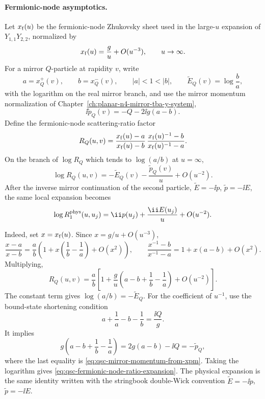 \paragraph{Fermionic-node asymptotics.}
Let \(x_{\rm f}(u)\) be the fermionic-node Zhukovsky sheet used in the
large-\(u\) expansion of \(Y_{1,1}Y_{2,2}\), normalized by
\[
  x_{\rm f}(u)=\frac{g}{u}+O(u^{-3}),\qquad u\to\infty .
\]
For a mirror \(Q\)-particle at rapidity \(v\), write
\[
  a=x_Q^+(v),\qquad b=x_Q^-(v),
  \qquad |a|<1<|b|,
  \qquad
  \widetilde E_Q(v)=\log\frac{b}{a},
\]
with the logarithm on the real mirror branch, and use the mirror momentum
normalization of Chapter~\ref{ch:planar-n4-mirror-tba-y-system},
\begin{equation}
  \ii\widetilde p_Q(v)=-Q-2\ii g(a-b).
  \label{eq:qsc-mirror-momentum-from-xpm}
\end{equation}
Define the fermionic-node scattering-ratio factor
\[
  R_Q(u,v)=
  \frac{x_{\rm f}(u)-a}{x_{\rm f}(u)-b}\,
  \frac{x_{\rm f}(u)^{-1}-b}{x_{\rm f}(u)^{-1}-a}.
\]
On the branch of \(\log R_Q\) which tends to
\(\log(a/b)\) at \(u=\infty\),
\begin{equation}
  \log R_Q(u,v)
  =
  -\widetilde E_Q(v)-\frac{\widetilde p_Q(v)}{u}
  +O(u^{-2}).
  \label{eq:qsc-fermionic-node-ratio-expansion}
\end{equation}
After the inverse mirror continuation of the second particle,
\(\widetilde E=-\ii p\), \(\widetilde p=-\ii E\), the same local expansion
becomes
\[
  \log R_1^{\rm phys}(u,u_j)
  =
  \ii p(u_j)+\frac{\ii E(u_j)}{u}+O(u^{-2}).
\]

Indeed, set \(x=x_{\rm f}(u)\).  Since \(x=g/u+O(u^{-3})\),
\[
  \frac{x-a}{x-b}
  =
  \frac{a}{b}
  \left(1+x\left(\frac1b-\frac1a\right)+O(x^2)\right),
  \qquad
  \frac{x^{-1}-b}{x^{-1}-a}
  =
  1+x(a-b)+O(x^2).
\]
Multiplying,
\[
  R_Q(u,v)
  =
  \frac{a}{b}
  \left[
    1+\frac{g}{u}
    \left(a-b+\frac1b-\frac1a\right)
    +O(u^{-2})
  \right].
\]
The constant term gives
\(\log(a/b)=-\widetilde E_Q\).  For the coefficient of \(u^{-1}\), use the
bound-state shortening condition
\[
  a+\frac1a-b-\frac1b=\frac{\ii Q}{g}.
\]
It implies
\[
  g\left(a-b+\frac1b-\frac1a\right)
  =
  2g(a-b)-\ii Q
  =
  -\widetilde p_Q,
\]
where the last equality is
\eqref{eq:qsc-mirror-momentum-from-xpm}.  Taking the logarithm gives
\eqref{eq:qsc-fermionic-node-ratio-expansion}.  The physical expansion is
the same identity written with the stringbook double-Wick convention
\(\widetilde E=-\ii p\), \(\widetilde p=-\ii E\).

